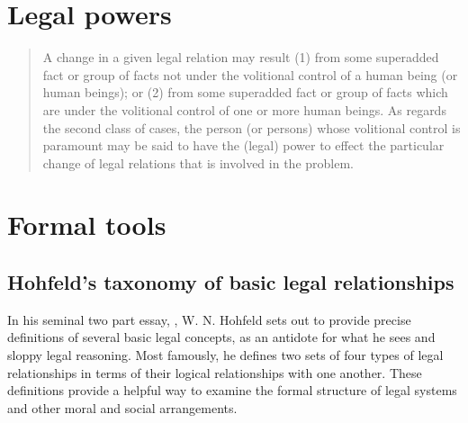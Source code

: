 \section{Legal powers}\label{sec:legal-powers}  
\begin{quote} 
  A change in a given legal relation may result (1) from some superadded fact
  or group of facts not under the volitional control of a human being (or human
  beings); or (2) from some superadded fact or group of facts which are under
  the volitional control of one or more human beings.
  As regards the second class of cases, the person (or persons) whose
  volitional control is paramount may be said to have the (legal) power to
  effect the particular change of legal relations that is involved in the
  problem. \citep[44]{hohfeldfundamentallegal1913}
\end{quote}

\section{Formal tools}\label{sec:formal-tools}

\subsection{Hohfeld's taxonomy of basic legal relationships}\label{sec:hohf-taxon}

In his seminal two part essay, , W.
N. Hohfeld \citep{hohfeldfundamentallegal1913,hohfeldfundamentallegal1917} sets
out to provide precise definitions of several basic legal concepts, as an
antidote for what he sees and sloppy legal reasoning.
Most famously, he defines two sets of four types of legal relationships in terms
of their logical relationships with one another.
These definitions provide a helpful way to examine the formal structure of legal
systems and other moral and social arrangements.


